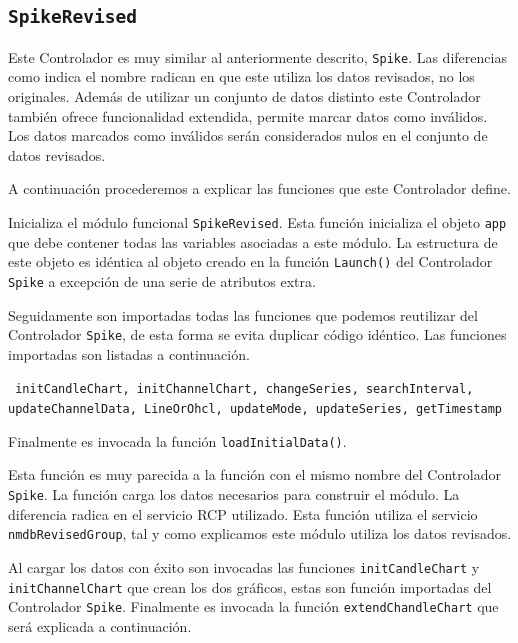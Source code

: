 	\subsection{\texttt{SpikeRevised}}
		Este Controlador es muy similar al anteriormente descrito, \texttt{Spike}. Las diferencias como indica el nombre radican en que este
		utiliza los datos revisados, no los originales. Además de utilizar un conjunto de datos distinto este Controlador también ofrece
		funcionalidad extendida, permite marcar datos como inválidos. Los datos marcados como inválidos serán considerados nulos en el
		conjunto de datos revisados.
		\par
		A continuación procederemos a explicar las funciones que este Controlador define.
		\begin{description}[style=unboxed,leftmargin=0cm]
			\item[\texttt{Launch()}]
				Inicializa el módulo funcional \texttt{SpikeRevised}. Esta función inicializa el objeto \texttt{app} que debe contener
				todas las variables asociadas a este módulo. La estructura de este objeto es idéntica al objeto creado en la función
				\texttt{Launch()} del Controlador \texttt{Spike} a excepción de una serie de atributos extra. 
				\par
				Seguidamente son importadas todas las funciones que podemos reutilizar del Controlador \texttt{Spike}, de esta forma
				se evita duplicar código idéntico. Las funciones importadas son listadas a continuación.
					\begin{center} \texttt{	initCandleChart, initChannelChart, changeSeries, searchInterval, updateChannelData,
					  			LineOrOhcl, updateMode, updateSeries, getTimestamp}
					\end{center}
				Finalmente es invocada la función \texttt{loadInitialData()}.
		    	\item[\texttt{loadInitialData()}]
				Esta función es muy parecida a la función con el mismo nombre del Controlador \texttt{Spike}. La función carga los
				datos necesarios para construir el módulo. La diferencia radica en el servicio RCP utilizado. Esta función utiliza el
				servicio \texttt{nmdbRevisedGroup}, tal y como explicamos este módulo utiliza los datos revisados.
				\par
				Al cargar los datos con éxito son invocadas las funciones \texttt{initCandleChart} y \texttt{initChannelChart} que
				crean los dos gráficos, estas son función importadas del Controlador \texttt{Spike}. Finalmente es invocada la función
				\texttt{extendChandleChart} que será explicada a continuación.

\end{description}
